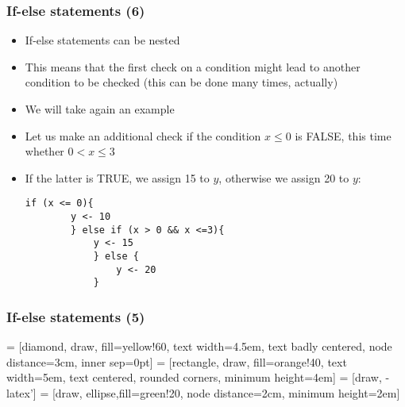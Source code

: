 \documentclass[10pt]{beamer}
\theoremstyle{definition}
\begin{document}
\begin{frame}[fragile]
\frametitle{If-else statements (6)}
\begin{itemize}
	\item If-else statements can be nested
	\item This means that the first check on a condition might lead to another condition to be checked (this can be done many times, actually)
	\item We will take again an example
	\item Let us make an additional check if the condition $x \leq 0$ is FALSE, this time whether $0 < x \leq 3$
	\item If the latter is TRUE, we assign 15 to $y$, otherwise we assign 20 to $y$:
	\begin{lstlisting}[style = rstyle, breaklines]
	if (x <= 0){
		y <- 10
		} else if (x > 0 && x <=3){
			y <- 15
			} else {
				y <- 20
			}
	\end{lstlisting}
\end{itemize}
\end{frame}

\begin{frame}[fragile]
\frametitle{If-else statements (5)}
 = [diamond, draw, fill=yellow!60, 
    text width=4.5em, text badly centered, node distance=3cm, inner sep=0pt]
 = [rectangle, draw, fill=orange!40, 
    text width=5em, text centered, rounded corners, minimum height=4em]
 = [draw, -latex']
 = [draw, ellipse,fill=green!20, node distance=2cm,
    minimum height=2em]

\begin{center}
\end{center} 
\end{frame}
\end{document}

